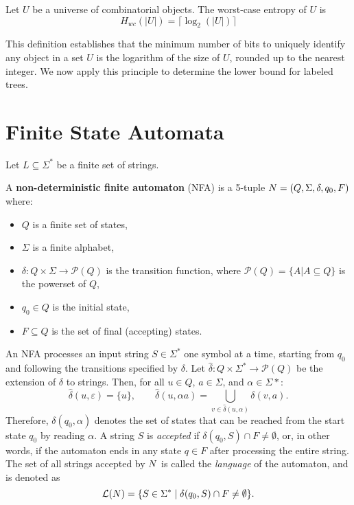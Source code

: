 \begin{definition}
Let $U$ be a universe of combinatorial objects. The worst-case entropy of $U$ is 
$$ H_{wc}(|U|) = \lceil\log_2(|U|)\rceil $$
\end{definition}

This definition establishes that the minimum number of bits to uniquely identify any object in a set $U$ is the logarithm of the size of $U$, rounded up to the nearest integer. We now apply this principle to determine the lower bound for labeled trees.


\section{Finite State Automata} \label{sed:fsa}

Let $L \subseteq \Sigma^*$ be a finite set of strings.

\begin{definition} \label{def:nfa}
    A \textbf{non-deterministic finite automaton} (NFA) is a 5-tuple $N = (Q, \Sigma, \delta, q_0, F)$ where:
    \begin{itemize}
        \item $Q$ is a finite set of states,
        \item $\Sigma$ is a finite alphabet,
        \item $\delta: Q \times \Sigma \to \mathcal{P}(Q)$ is the transition function, where $\mathcal{P}(Q) = \{A | A \subseteq Q \}$ is the powerset of $Q$,
        \item $q_0 \in Q$ is the initial state,
        \item $F \subseteq Q$ is the set of final (accepting) states.
    \end{itemize}
\end{definition}

An NFA processes an input string $S \in \Sigma^*$ one symbol at a time, starting from $q_0$ and following the transitions specified by $\delta$.
Let $\hat\delta: Q \times \Sigma^* \to \mathcal{P}(Q)$ be the extension of $\delta$ to strings.
Then, for all $u \in Q$, $a \in \Sigma$, and $\alpha \in \Sigma*$:
\[
\hat\delta(u,\varepsilon)=\{u\}, \qquad
\hat\delta(u,\alpha a)=\bigcup_{v \in \hat\delta(u,\alpha)} \delta(v,a).
\]
Therefore, $\delta(q_0,\alpha)$ denotes the set of states that can be reached from the start state $q_0$ by reading $\alpha$.
A string $S$ is \emph{accepted} if $\delta(q_0, S)\cap F \neq \emptyset$, or, in other words, if the automaton ends in any state $q \in F$ after processing the entire string.
The set of all strings accepted by $N$ is called the \emph{language} of the automaton, and is denoted as
\[
\mathcal{L}(N)=\{S \in \Sigma^* \mid \delta(q_0, S)\cap F \neq \emptyset\}.
\]

